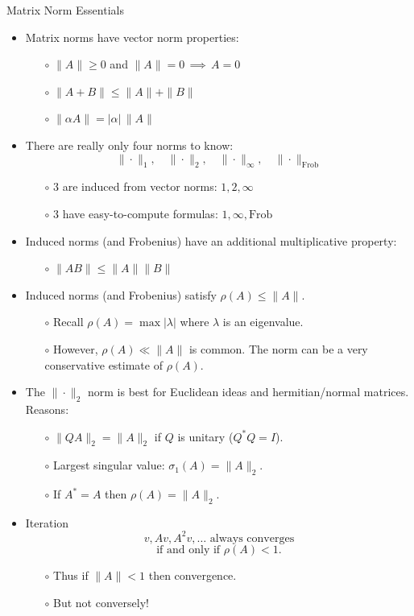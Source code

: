 \documentclass{amsart}
\newcommand{\alert}[1]{{\color{red} #1}}
\begin{document}
\Huge
\centerline{Matrix Norm Essentials}

\thispagestyle{empty}

\bigskip\bigskip\bigskip\bigskip\bigskip
\LARGE
\begin{itemize}
\setlength\itemsep{1em}
\item Matrix norms have vector norm \alert{properties}:
  \begin{itemize}
  \item[$\circ$] $\|A\| \ge 0$ and $\|A\|=0 \,\implies \,A=0$
  \item[$\circ$] $\|A+B\| \le \|A\| + \|B\|$
  \item[$\circ$] $\|\alpha A\| = |\alpha|\,\|A\|$
  \end{itemize}
\item There are really only \alert{four} norms to know:
  $$\|\cdot\|_1, \quad \|\cdot\|_2, \quad \|\cdot\|_\infty, \quad \|\cdot\|_{\mathrm{Frob}}$$
  \begin{itemize}
  \item[$\circ$] 3 are \alert{induced} from vector norms: \quad $1,2,\infty$
  \item[$\circ$] 3 have \alert{easy-to-compute formulas}: \quad $1,\infty,\mathrm{Frob}$
  \end{itemize}
\item Induced norms (and Frobenius) have an additional \alert{multiplicative} property:
  \begin{itemize}
  \item[$\circ$] $\|A B\|\le \|A\|\|B\|$
  \end{itemize}
\item Induced norms (and Frobenius) satisfy $\rho(A)\le \|A\|$.
  \begin{itemize}
  \item[$\circ$] Recall $\rho(A) = \max |\lambda|$ where $\lambda$ is an eigenvalue.
  \item[$\circ$] However, $\rho(A)\ll\|A\|$ is common.  The norm can be a very conservative estimate of $\rho(A)$.
  \end{itemize}
\item The $\|\cdot\|_2$ norm is best for \alert{Euclidean ideas} and \alert{hermitian/normal matrices}.  Reasons: 
  \begin{itemize}
  \item[$\circ$]  $\|QA\|_2 = \|A\|_2$ if $Q$ is unitary ($Q^* Q = I$).
  \item[$\circ$]  Largest singular value: $\sigma_1(A) = \|A\|_2$.
  \item[$\circ$]  If $A^*=A$ then $\rho(A)=\|A\|_2$.
  \end{itemize}
\item \alert{Iteration}
    $$v, Av, A^2v, \dots \text{ always converges}$$
    $$\text{if and only if } \rho(A)<1.$$
  \begin{itemize}
  \item[$\circ$] Thus \alert{if} $\|A\|<1$ \alert{then} convergence.
  \item[$\circ$] But not conversely!
  \end{itemize}
\end{itemize}
\end{document}
